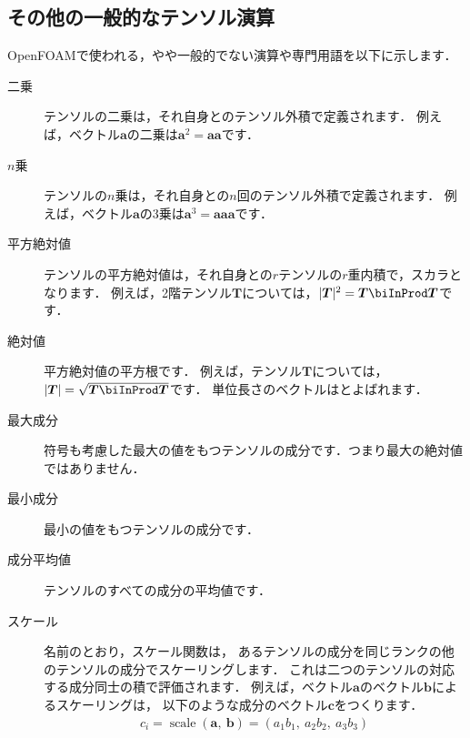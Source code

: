 \subsection{その他の一般的なテンソル演算}
\label{ssec:1.3.6}
OpenFOAMで使われる，やや一般的でない演算や専門用語を以下に示します．
\begin{description}
 \item[二乗] テンソルの二乗は，それ自身とのテンソル外積で定義されます．
            例えば，ベクトル$\bm{a}$の二乗は$\bm{a}^{2} = \bm{a}\bm{a}$です．
 \item[$n$乗] テンソルの$n$乗は，それ自身との$n$回のテンソル外積で定義されます．
            例えば，ベクトル$\bm{a}$の$3$乗は$\bm{a}^{3} = \bm{a}\bm{a}\bm{a}$です．
 \item[平方絶対値] テンソルの平方絶対値は，それ自身との$r$テンソルの$r$重内積で，スカラとなります．
            例えば，2階テンソル$\bm{T}$については，$|\bm{T}|^{2} = \bm{T} \biInProd \bm{T}$です．
 \item[絶対値] 平方絶対値の平方根です．
            例えば，テンソル$\bm{T}$については，$|\bm{T}| = \sqrt{\bm{T} \biInProd \bm{T}}$です．
            単位長さのベクトルはとよばれます．
 \item[最大成分] 符号も考慮した最大の値をもつテンソルの成分です．つまり最大の絶対値ではありません．
 \item[最小成分] 最小の値をもつテンソルの成分です．
 \item[成分平均値] テンソルのすべての成分の平均値です．
 \item[スケール] 名前のとおり，スケール関数は，
            あるテンソルの成分を同じランクの他のテンソルの成分でスケーリングします．
            これは二つのテンソルの対応する成分同士の積で評価されます．
            例えば，ベクトル$\bm{a}$のベクトル$\bm{b}$によるスケーリングは，
            以下のような成分のベクトル$\bm{c}$をつくります．
            \begin{align}
             \label{eq:1.24}
             c_{i} = \mathop{\mathrm{scale}}(\bm{a},\ \bm{b})
             = (a_{1}b_{1},\ a_{2}b_{2},\ a_{3}b_{3})
            \end{align}
\end{description}


